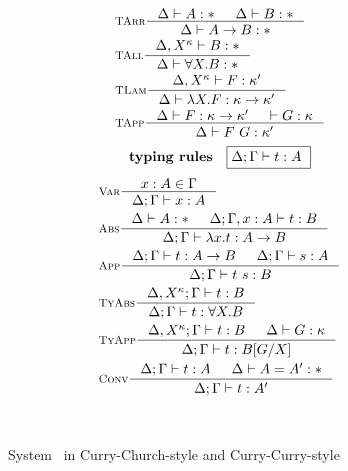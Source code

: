 \begin{figure}
\begin{singlespace}
\begin{minipage}{.46\textwidth}
\begin{align*}
& \inference[\sc TArr]{\Delta |- A:* & \Delta |- B:*}{\Delta |- A -> B:*} \\
& \inference[\sc TAll]{\Delta,X^\kappa |- B:*}{\Delta |- \forall X.B:*} \\
& \inference[\sc TLam]{\Delta,X^\kappa |- F:\kappa'}
                      {\Delta |- \l X.F:\kappa -> \kappa'} \\
& \inference[\sc TApp]{\Delta |- F : \kappa -> \kappa' & |- G : \kappa}
                      {\Delta |- F ~ G : \kappa'} \\
\end{align*}
\[ \textbf{typing rules} \quad \framebox{$ \Delta;\Gamma |- t : A $ } \]
\vspace*{-1em}
\begin{align*}
& \inference[\sc Var]{x:A \in \Gamma}{\Delta;\Gamma |- x:A} \\
& \inference[\sc Abs]{\Delta |- A:* & \Delta;\Gamma,x:A |- t : B}
                     {\Delta;\Gamma |- \l x   .t : A -> B} \\
& \inference[\sc App]{\Delta;\Gamma |- t : A -> B & \Delta;\Gamma |- s : A}
                     {\Delta;\Gamma |- t~s : B} \\
& \inference[\sc TyAbs]{\Delta,X^\kappa;\Gamma |- t : B}
                       {\Delta;\Gamma |- t : \forall X.B} \\
& \inference[\sc TyApp]{\Delta,X^\kappa;\Gamma |- t : B & \Delta |- G:\kappa}
                       {\Delta;\Gamma |- t : B[G/X]} \\
& \inference[\sc Conv]{\Delta;\Gamma |- t : A & \Delta |- A = A' : *}
                      {\Delta;\Gamma |- t : A'}
\end{align*}
\end{minipage}
~\\
\caption{System \Fw\ in Curry-Church-style and Curry-Curry-style}
\label{fig:fw2}
\end{singlespace}
\end{figure}

